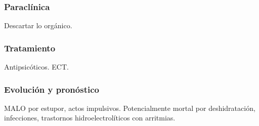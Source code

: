 \subsubsection*{Paraclínica}

Descartar lo orgánico.

\subsubsection*{Tratamiento}

Antipsicóticos. ECT.

\subsubsection*{Evolución y pronóstico}

MALO por estupor, actos impulsivos. Potencialmente mortal por deshidratación, infecciones, trastornos hidroelectrolíticos con arritmias.
